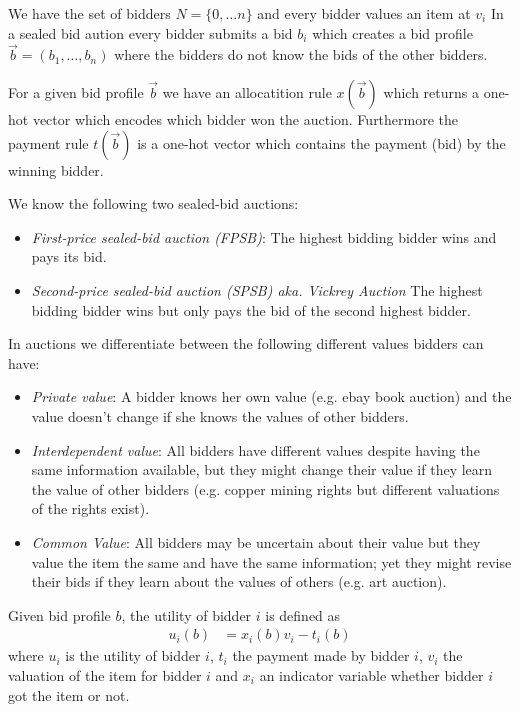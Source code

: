 \documentclass[12pt]{article}
\theoremstyle{definition}
\theoremstyle{remark}
\begin{document}
\begin{definition}
We have the set of bidders $N = \{0,\ldots n\}$ and every bidder values an item at $v_i$ In a sealed bid aution every bidder submits a bid $b_i$ which creates a bid profile $\vec{b}  = (b_1,\ldots, b_n)$ where the bidders do not know the bids of the other bidders.

For a given bid profile $\vec{b}$ we have an allocatition rule $x(\vec{b})$ which returns a one-hot vector which encodes which bidder won the auction. Furthermore the payment rule $t(\vec{b})$ is a one-hot vector which contains the payment (bid) by the winning bidder.

We know the following two sealed-bid auctions:

\begin{itemize}
	\item \textit{First-price sealed-bid auction (FPSB)}: The highest bidding bidder  wins and pays its bid.
	\item \textit{Second-price sealed-bid auction (SPSB) aka. Vickrey Auction} The highest bidding bidder wins but only pays the bid of the second highest bidder.
\end{itemize}


\end{definition}

\begin{definition}[Values] In auctions we differentiate between the following different values bidders can have: 
	\begin{itemize}
		\item \textit{Private value}: A bidder knows her own value (e.g. ebay book auction) and the value doesn't change if she knows the values of other bidders.
		\item \textit{Interdependent value}: All bidders have different values despite having the same information available, but they might change their value if they learn the value of other bidders (e.g. copper mining rights but different valuations of the rights exist).
		\item \textit{Common Value}: All bidders may be uncertain about their value but they value the item the same and have the same information; yet they might revise their bids if they learn about the values of others (e.g. art auction).
	\end{itemize}
\end{definition}


\begin{definition}
	Given bid profile $b$, the utility of bidder $i$ is defined as
	\begin{align*}
		u_i(b) &= x_i(b) v_i - t_i(b)
	\end{align*}
	where $u_i$ is the utility of bidder $i$, $t_i$ the payment made by bidder $i$, $v_i$ the valuation of the item for bidder $i$ and $x_i$ an indicator variable whether bidder $i$ got the item or not.
\end{definition}
\end{document}
